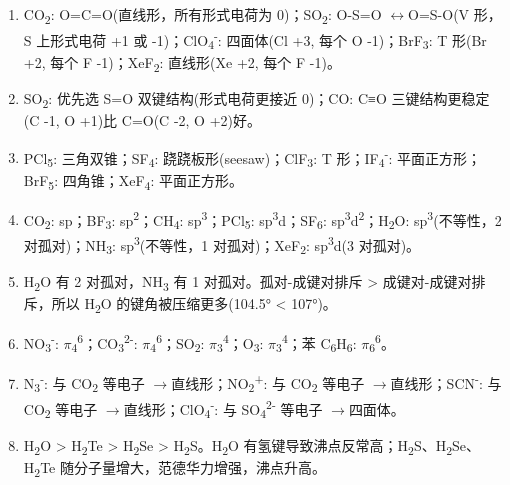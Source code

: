 \documentclass[a4paper,11pt]{ctexart}
\newcommand{\箭}{\ensuremath{\rightarrow}}
\newcommand{\左箭}{\ensuremath{\leftarrow}}
\newcommand{\上箭}{\ensuremath{\uparrow}}
\newcommand{\下箭}{\ensuremath{\downarrow}}
\newcommand{\衡}{\ensuremath{\rightleftharpoons}}
\newcommand{\双箭}{\ensuremath{\leftrightarrow}}
\newcommand{\约等于}{\ensuremath{\approx}}
\newcommand{\小于等于}{\ensuremath{\leq}}
\newcommand{\大于等于}{\ensuremath{\geq}}
\newcommand{\不等于}{\ensuremath{\neq}}
\newcommand{\西格马}{\ensuremath{\sigma}}
\newcommand{\派}{\ensuremath{\pi}}
\begin{document}
\begin{enumerate}
\def\labelenumi{\arabic{enumi}.}
\setcounter{enumi}{4}
\item
  CO\textsubscript{2}: O=C=O(直线形，所有形式电荷为 0)；SO\textsubscript{2}: O-S=O \双箭 O=S-O(V 形，S 上形式电荷 +1 或 -1)；ClO\textsubscript{4}\textsuperscript{-}: 四面体(Cl +3, 每个 O -1)；BrF\textsubscript{3}: T 形(Br +2, 每个 F -1)；XeF\textsubscript{2}: 直线形(Xe +2, 每个 F -1)。
\item
  SO\textsubscript{2}: 优先选 S=O 双键结构(形式电荷更接近 0)；CO: C≡O 三键结构更稳定(C -1, O +1)比 C=O(C -2, O +2)好。
\item
  PCl\textsubscript{5}: 三角双锥；SF\textsubscript{4}: 跷跷板形(seesaw)；ClF\textsubscript{3}: T 形；IF\textsubscript{4}\textsuperscript{-}: 平面正方形；BrF\textsubscript{5}: 四角锥；XeF\textsubscript{4}: 平面正方形。
\item
  CO\textsubscript{2}: sp；BF\textsubscript{3}: sp\textsuperscript{2}；CH\textsubscript{4}: sp\textsuperscript{3}；PCl\textsubscript{5}: sp\textsuperscript{3}d；SF\textsubscript{6}: sp\textsuperscript{3}d\textsuperscript{2}；H\textsubscript{2}O: sp\textsuperscript{3}(不等性，2 对孤对)；NH\textsubscript{3}: sp\textsuperscript{3}(不等性，1 对孤对)；XeF\textsubscript{2}: sp\textsuperscript{3}d(3 对孤对)。
\item
  H\textsubscript{2}O 有 2 对孤对，NH\textsubscript{3} 有 1 对孤对。孤对-成键对排斥 \textgreater{} 成键对-成键对排斥，所以 H\textsubscript{2}O 的键角被压缩更多(104.5° \textless{} 107°)。
\item
  NO\textsubscript{3}\textsuperscript{-}: \派\textsubscript{4}\textsuperscript{6}；CO\textsubscript{3}\textsuperscript{2-}: \派\textsubscript{4}\textsuperscript{6}；SO\textsubscript{2}: \派\textsubscript{3}\textsuperscript{4}；O\textsubscript{3}: \派\textsubscript{3}\textsuperscript{4}；苯 C\textsubscript{6}H\textsubscript{6}: \派\textsubscript{6}\textsuperscript{6}。
\item
  N\textsubscript{3}\textsuperscript{-}: 与 CO\textsubscript{2} 等电子 \箭 直线形；NO\textsubscript{2}\textsuperscript{+}: 与 CO\textsubscript{2} 等电子 \箭 直线形；SCN\textsuperscript{-}: 与 CO\textsubscript{2} 等电子 \箭 直线形；ClO\textsubscript{4}\textsuperscript{-}: 与 SO\textsubscript{4}\textsuperscript{2-} 等电子 \箭 四面体。
\item
  H\textsubscript{2}O \textgreater{} H\textsubscript{2}Te \textgreater{} H\textsubscript{2}Se \textgreater{} H\textsubscript{2}S。H\textsubscript{2}O 有氢键导致沸点反常高；H\textsubscript{2}S、H\textsubscript{2}Se、H\textsubscript{2}Te 随分子量增大，范德华力增强，沸点升高。

\end{enumerate}
\end{document}
